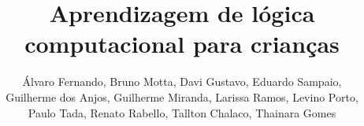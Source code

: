\sloppy

\title{Aprendizagem de lógica computacional para crianças}

\author{Álvaro Fernando, Bruno Motta, Davi Gustavo, Eduardo Sampaio, \\ Guilherme dos Anjos, Guilherme Miranda, Larissa Ramos, Levino Porto, \\ Paulo Tada, Renato Rabello, Tallton Chalaco, Thainara Gomes}

\address{Faculdade Gama - Universidade de Brasília (UnB)}

